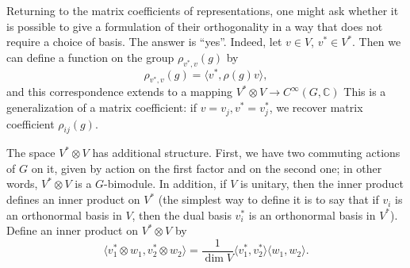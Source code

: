 \documentclass{report}
\begin{document}
    
Returning to the matrix coefficients of representations, one might ask whether it is possible to give a formulation of their orthogonality in a way that does not require a choice of basis. The answer is “yes”. Indeed, let \( v \in V \), \( v^* \in V^* \). Then we can define a function on the group \( \rho_{v^*, v}(g) \) by
\[
\rho_{v^*, v}(g) = \langle v^*, \rho(g)v \rangle,
\]
and this correspondence extends to a mapping $ V^* \otimes V \rightarrow C^\infty(G, \mathbb{C})$
This is a generalization of a matrix coefficient: if \( v = v_j, v^* = v_j^* \), we recover matrix coefficient \( \rho_{ij}(g) \).

The space \( V^* \otimes V \) has additional structure. First, we have two commuting actions of \( G \) on it, given by action on the first factor and on the second one; in other words, \( V^* \otimes V \) is a \( G \)-bimodule. In addition, if \( V \) is unitary, then the inner product defines an inner product on \( V^* \) (the simplest way to define it is to say that if \( v_i \) is an orthonormal basis in \( V \), then the dual basis \( v_i^* \) is an orthonormal basis in \( V^* \)). Define an inner product on \( V^* \otimes V \) by
\begin{equation}\label{eq:inner_product_tensors}
    \langle v_1^* \otimes w_1, v_2^* \otimes w_2 \rangle = \frac{1}{\dim V} \langle v_1^*, v_2^* \rangle \langle w_1, w_2 \rangle.
\end{equation}
\end{document}
